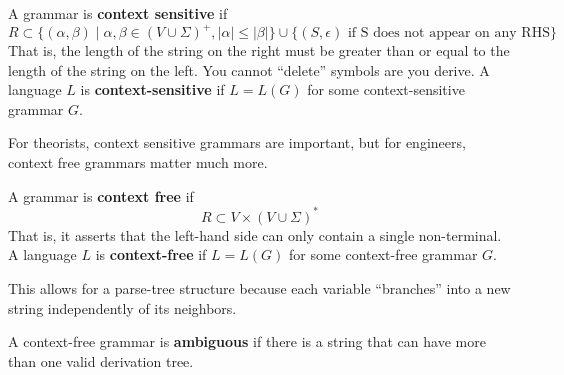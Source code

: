   \begin{definition}
    A grammar is \textbf{context sensitive} if 
    \begin{equation}
      R \subset \{(\alpha, \beta) \mid \alpha, \beta \in (V \cup \Sigma)^+, |\alpha| \leq |\beta|\} \cup \{(S, \epsilon) \text{ if S does not appear on any RHS} \}
    \end{equation}
    That is, the length of the string on the right must be greater than or equal to the length of the string on the left. You cannot ``delete'' symbols are you derive. A language $L$ is \textbf{context-sensitive} if $L = L(G)$ for some context-sensitive grammar $G$. 
  \end{definition}

  For theorists, context sensitive grammars are important, but for engineers, context free grammars matter much more.  

  \begin{definition}
    A grammar is \textbf{context free} if 
    \begin{equation}
      R \subset V \times (V \cup \Sigma)^\ast
    \end{equation}
    That is, it asserts that the left-hand side can only contain a single non-terminal. A language $L$ is \textbf{context-free} if $L = L(G)$ for some context-free grammar $G$. 
  \end{definition}

  This allows for a parse-tree structure because each variable ``branches'' into a new string independently of its neighbors. 

  \begin{definition}[Ambiguous]
    A context-free grammar is \textbf{ambiguous} if there is a string that can have more than one valid derivation tree. 
  \end{definition}

